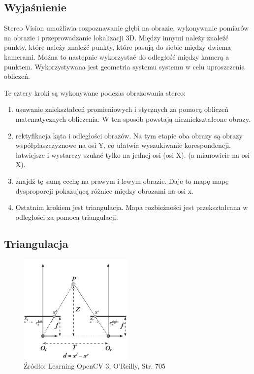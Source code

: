 \documentclass[magisterska]{pracadypl}
\begin{document}
\subsection{Wyjaśnienie}

Stereo Vision umożliwia rozpoznawanie głębi na obrazie, wykonywanie pomiarów na obrazie
i przeprowadzanie lokalizacji 3D. Między innymi należy znaleźć punkty, które
należy znaleźć punkty, które pasują do siebie między dwiema kamerami. Można to następnie wykorzystać do
odległość między kamerą a punktem. Wykorzystywana jest geometria systemu
systemu w celu uproszczenia obliczeń.

Te cztery kroki są wykonywane podczas obrazowania stereo:

\begin{enumerate}
  \item usuwanie zniekształceń promieniowych i stycznych za pomocą obliczeń matematycznych
obliczenia. W ten sposób powstają niezniekształcone obrazy.
  \item rektyfikacja kąta i odległości obrazów. Na tym etapie oba obrazy są
obrazy współpłaszczyznowe na osi Y, co ułatwia wyszukiwanie korespondencji.
łatwiejsze i wystarczy szukać tylko na jednej osi (osi X).
(a mianowicie na osi X).
  \item znajdź tę samą cechę na prawym i lewym obrazie. Daje to mapę
mapę dysproporcji pokazującą różnice między obrazami na osi x.
  \item Ostatnim krokiem jest triangulacja. Mapa rozbieżności jest przekształcana w
odległości za pomocą triangulacji.
\end{enumerate}

\subsection{Triangulacja}

\begin{figure}[h]  %
    \centering  %
    \includegraphics[width=0.5\textwidth]{images/triangulation.png}  %
    \captionsetup{labelformat=empty, font=footnotesize}
    \caption{Źródło: Learning OpenCV 3, O'Reilly, Str. 705}
    \label{fig:rpi}  %
\end{figure}
\end{document}
